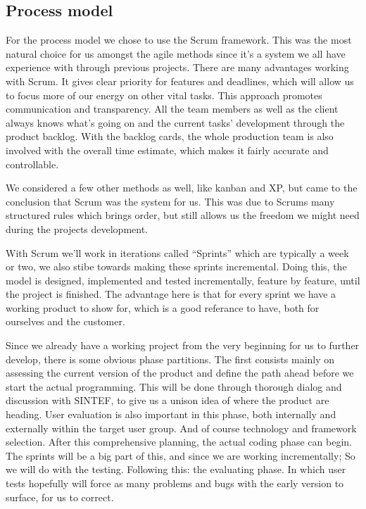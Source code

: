 	\subsection{Process model}
For the process model we chose to use the Scrum framework. This was the most natural choice for us amongst the agile methods since it’s a system we all have experience with through previous projects. There are many advantages working with Scrum. It gives clear priority for features and deadlines, which will allow us to focus more of our energy on other vital tasks. This approach promotes communication and transparency. All the team members as well as the client always knows what’s going on and the current tasks’ development through the product backlog. With the backlog cards, the whole production team is also involved with the overall time estimate, which makes it fairly accurate and controllable.

We considered a few other methods as well, like kanban and XP, but came to the conclusion that Scrum was the system for us. This was due to Scrums many structured rules which brings order, but still allows us the freedom we might need during the projects development.

With Scrum we’ll work in iterations called “Sprints” which are typically a week or two, we also stibe towards making these sprints incremental. Doing this, the model is designed, implemented and tested incrementally, feature by feature, until the project is finished. The advantage here is that for every sprint we have a working product to show for, which is a good referance to have, both for ourselves and the customer. 

Since we already have a working project from the very beginning for us to further develop, there is some obvious phase partitions. The first consists mainly on assessing the current version of the product and define the path ahead before we start the actual programming. This will be done through thorough dialog and discussion with SINTEF, to give us a unison idea of where the product are heading. User evaluation is also important in this phase, both internally and externally within the target user group. And of course technology and framework selection. After this comprehensive planning, the actual coding phase can begin. The sprints will be a big part of this, and since we are working incrementally; So we will do with the testing. Following this: the evaluating phase. In which user tests hopefully will force as many problems and bugs with the early version to surface, for us to correct.


